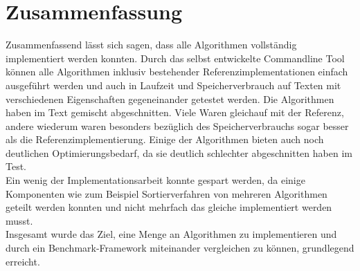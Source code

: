 \section{Zusammenfassung}

Zusammenfassend  lässt sich sagen, dass alle Algorithmen vollständig implementiert werden konnten. Durch das selbst entwickelte Commandline Tool können alle Algorithmen inklusiv bestehender Referenzimplementationen einfach ausgeführt werden und auch in Laufzeit und Speicherverbrauch auf Texten mit verschiedenen Eigenschaften gegeneinander getestet werden. Die Algorithmen haben im Text gemischt abgeschnitten. Viele Waren gleichauf mit der Referenz, andere wiederum waren besonders bezüglich des Speicherverbrauchs sogar besser als die Referenzimplementierung. Einige der Algorithmen bieten auch noch deutlichen Optimierungsbedarf, da sie deutlich schlechter abgeschnitten haben im Test.\\
Ein wenig der Implementationsarbeit konnte gespart werden, da einige Komponenten wie zum Beispiel Sortierverfahren von mehreren Algorithmen geteilt werden konnten und nicht mehrfach das gleiche implementiert werden musst.\\
Insgesamt wurde das Ziel, eine Menge an Algorithmen zu implementieren und durch ein Benchmark-Framework miteinander vergleichen zu können, grundlegend erreicht.
